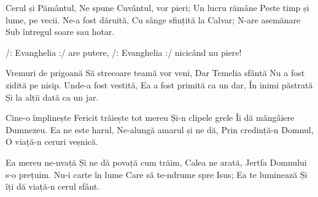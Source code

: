 \beginverse
Cerul și Pământul,
Ne spune Cuvântul, vor pieri;
Un lucru rămâne
Peste timp și lume, pe vecii.
Ne-a fost dăruită,
Cu sânge sfințită la Calvar;
N-are asemănare
Sub întregul soare sau hotar.
\endverse

\beginchorus
/: Evanghelia :/ are putere,
/: Evanghelia :/ nicicând nu piere!
\endchorus

\beginverse
Vremuri de prigoană
Să strecoare teamă vor veni,
Dar Temelia sfântă
Nu a fost zidită pe nisip.
Unde-a fost vestită,
Ea a fost primită ca un dar,
În inimi păstrată
Și la alții dată ca un jar.
\endverse

\beginverse
Cine-o împlinește
Fericit trăiește tot mereu
Și-n clipele grele
Îi dă mângâiere Dumnezeu.
Ea ne este harul,
Ne-alungă amarul și ne dă,
Prin credință-n Domnul,
O viață-n ceruri veșnică.
\endverse

\beginverse
Ea mereu ne-nvață
Și ne dă povață cum trăim,
Calea ne arată,
Jertfa Domnului s-o prețuim.
Nu-i carte în lume
Care să te-ndrume spre Isus;
Ea te luminează
Și îți dă viață-n cerul sfânt.
\endverse
\endsong